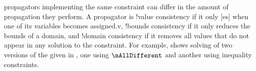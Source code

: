 \Glspl{propagator} implementing the same \gls{constraint} can differ in the
amount of propagation they perform.
%
A \gls{propagator} is \glshyphened!{value consistency} if it only
[es] when one of its \glspl{variable} becomes
\gls{assigned.v}, \glshyphened!{bounds consistency} if it only reduces the
bounds of a \gls{domain}, and \glshyphened!{domain consistency} if it removes
all values that do not appear in any \gls{solution} to the \gls{constraint}.
%
For example,  shows solving of two versions
of the  given in , one
using $\mAllDifferent$ and another using inequality \glspl{constraint}.
%
\begin{table}
  \centering%
  \figureFont\figureFontSize%
\end{table}
